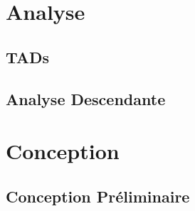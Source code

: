 \documentclass[12pt]{article}
\begin{document}


\newpage

\tableofcontents

\listoffigures


\newpage
\section{Analyse}

\subsection{TADs}







\subsection{Analyse Descendante}



\section{Conception}

\subsection{Conception Préliminaire}






\end{document}
